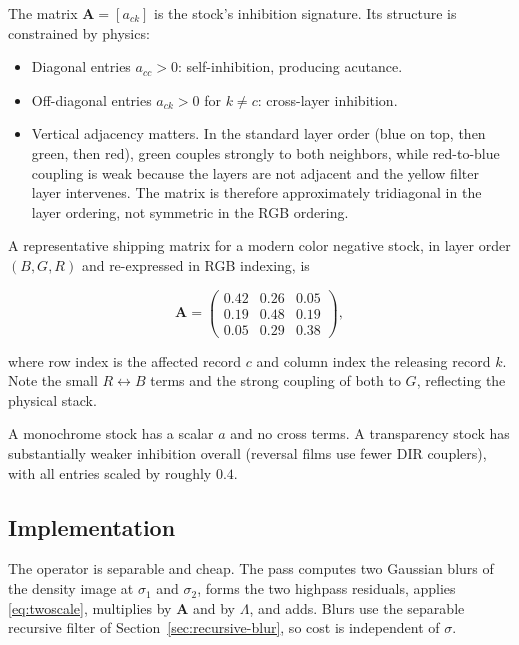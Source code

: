 The matrix $\mathbf{A} = [a_{ck}]$ is the stock's inhibition signature. Its
structure is constrained by physics:

\begin{itemize}
\item Diagonal entries $a_{cc} > 0$: self-inhibition, producing acutance.
\item Off-diagonal entries $a_{ck} > 0$ for $k \neq c$: cross-layer inhibition.
\item Vertical adjacency matters. In the standard layer order (blue on top,
then green, then red), green couples strongly to both neighbors, while
red-to-blue coupling is weak because the layers are not adjacent and the yellow
filter layer intervenes. The matrix is therefore approximately tridiagonal in
the layer ordering, not symmetric in the RGB ordering.
\end{itemize}

A representative shipping matrix for a modern color negative stock, in layer
order $(B, G, R)$ and re-expressed in RGB indexing, is

\begin{equation}
\mathbf{A} =
\begin{pmatrix}
0.42 & 0.26 & 0.05 \\
0.19 & 0.48 & 0.19 \\
0.05 & 0.29 & 0.38
\end{pmatrix},
\label{eq:dirmatrix}
\end{equation}

where row index is the affected record $c$ and column index the releasing
record $k$. Note the small $R\!\leftrightarrow\!B$ terms and the strong
coupling of both to $G$, reflecting the physical stack.

A monochrome stock has a scalar $a$ and no cross terms. A transparency stock has
substantially weaker inhibition overall (reversal films use fewer DIR couplers),
with all entries scaled by roughly $0.4$.

\subsection{Implementation}

The operator is separable and cheap. The pass computes two Gaussian blurs of the
density image at $\sigma_1$ and $\sigma_2$, forms the two highpass residuals,
applies \eqref{eq:twoscale}, multiplies by $\mathbf{A}$ and by $\Lambda$, and
adds. Blurs use the separable recursive filter of
Section~\ref{sec:recursive-blur}, so cost is independent of $\sigma$.

